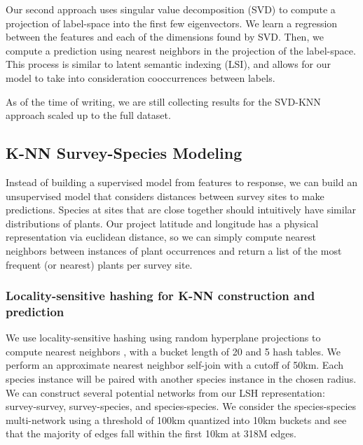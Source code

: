 Our second approach uses singular value decomposition (SVD) to compute a projection of label-space into the first few eigenvectors. 
We learn a regression between the features and each of the dimensions found by SVD. 
Then, we compute a prediction using nearest neighbors in the projection of the label-space. 
This process is similar to latent semantic indexing (LSI), and allows for our model to take into consideration cooccurrences between labels. 

As of the time of writing, we are still collecting results for the SVD-KNN approach scaled up to the full dataset.

\subsection{K-NN Survey-Species Modeling}

Instead of building a supervised model from features to response, we can build an unsupervised model that considers distances between survey sites to make predictions. 
Species at sites that are close together should intuitively have similar distributions of plants. 
Our project latitude and longitude has a physical representation via euclidean distance, so we can simply compute nearest neighbors between instances of plant occurrences and return a list of the most frequent (or nearest) plants per survey site.

\subsubsection{Locality-sensitive hashing for K-NN construction and prediction}

We use locality-sensitive hashing using random hyperplane projections to compute nearest neighbors \cite{leskovec2020mining}, with a bucket length of 20 and 5 hash tables. 
We perform an approximate nearest neighbor self-join with a cutoff of 50km. 
Each species instance will be paired with another species instance in the chosen radius. 
We can construct several potential networks from our LSH representation: survey-survey, survey-species, and species-species. 
We consider the species-species multi-network using a threshold of 100km quantized into 10km buckets and see that the majority of edges fall within the first 10km at 318M edges.

